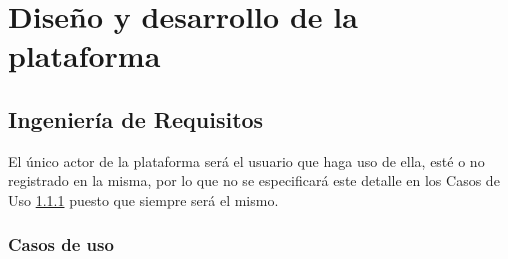                     \cleardoublepage



\chapter{Diseño y desarrollo de la plataforma}
    
    \section{Ingeniería de Requisitos}
        \label{cap:ingenieria-requisitos}
        
        
        
        El único actor de la plataforma será el usuario que haga uso de ella, esté o no registrado en la misma, por lo que no se especificará este detalle en los Casos de Uso \ref{sec:casos-uso} puesto que siempre será el mismo.
        
        
        \subsection{Casos de uso}
            \label{sec:casos-uso}
            
